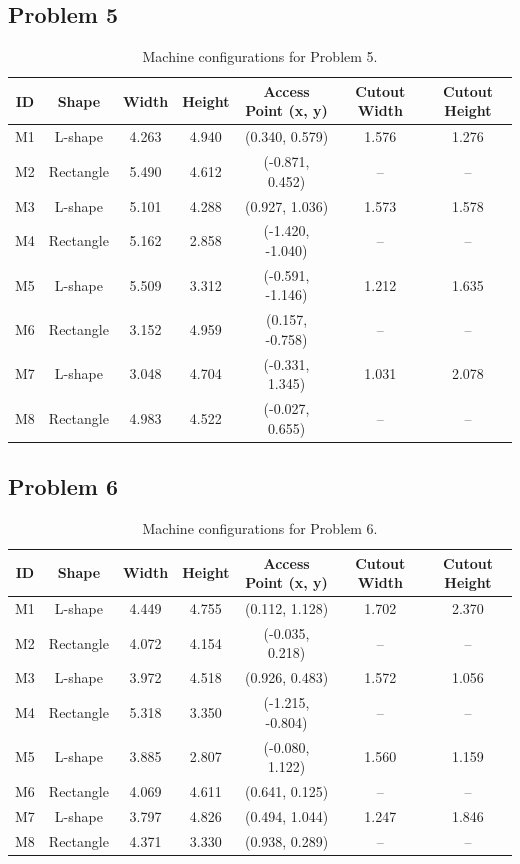 \subsection{Problem 5}
\begin{table}[H]
\centering
\small
\begin{tabular}{ccccccc}
\toprule
\textbf{ID} & \textbf{Shape} & \textbf{Width} & \textbf{Height} & \textbf{Access Point (x, y)} & \textbf{Cutout Width} & \textbf{Cutout Height} \\
\midrule
M1 & L-shape   & 4.263 & 4.940 & (0.340, 0.579)   & 1.576 & 1.276 \\
M2 & Rectangle & 5.490 & 4.612 & (-0.871, 0.452)  & --    & --    \\
M3 & L-shape   & 5.101 & 4.288 & (0.927, 1.036)   & 1.573 & 1.578 \\
M4 & Rectangle & 5.162 & 2.858 & (-1.420, -1.040) & --    & --    \\
M5 & L-shape   & 5.509 & 3.312 & (-0.591, -1.146) & 1.212 & 1.635 \\
M6 & Rectangle & 3.152 & 4.959 & (0.157, -0.758)  & --    & --    \\
M7 & L-shape   & 3.048 & 4.704 & (-0.331, 1.345)  & 1.031 & 2.078 \\
M8 & Rectangle & 4.983 & 4.522 & (-0.027, 0.655)  & --    & --    \\
\bottomrule
\end{tabular}
\caption{Machine configurations for Problem 5.}
\end{table}

\subsection{Problem 6}
\begin{table}[H]
\centering
\small
\begin{tabular}{ccccccc}
\toprule
\textbf{ID} & \textbf{Shape} & \textbf{Width} & \textbf{Height} & \textbf{Access Point (x, y)} & \textbf{Cutout Width} & \textbf{Cutout Height} \\
\midrule
M1 & L-shape   & 4.449 & 4.755 & (0.112, 1.128)   & 1.702 & 2.370 \\
M2 & Rectangle & 4.072 & 4.154 & (-0.035, 0.218)  & --    & --    \\
M3 & L-shape   & 3.972 & 4.518 & (0.926, 0.483)   & 1.572 & 1.056 \\
M4 & Rectangle & 5.318 & 3.350 & (-1.215, -0.804) & --    & --    \\
M5 & L-shape   & 3.885 & 2.807 & (-0.080, 1.122)  & 1.560 & 1.159 \\
M6 & Rectangle & 4.069 & 4.611 & (0.641, 0.125)   & --    & --    \\
M7 & L-shape   & 3.797 & 4.826 & (0.494, 1.044)   & 1.247 & 1.846 \\
M8 & Rectangle & 4.371 & 3.330 & (0.938, 0.289)   & --    & --    \\
\bottomrule
\end{tabular}
\caption{Machine configurations for Problem 6.}
\end{table}

